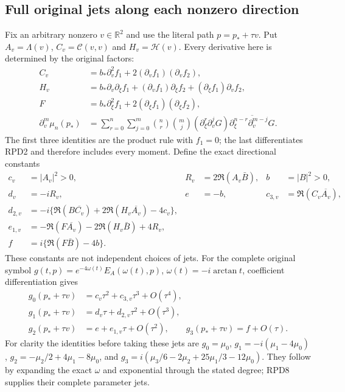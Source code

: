 \subsection{Full original jets along each nonzero direction}

Fix an arbitrary nonzero $v\in\mathbb R^2$ and use the literal path
$p=p_*+\tau v$.  Put
$A_v=\Lambda(v)$, $C_v=\mathcal C(v,v)$ and $H_v=\mathcal H(v)$.
Every derivative here is determined by the original factors:
\[
 \begin{aligned}
 C_v&=b_*\partial_v^2f_1+2(\partial_v f_1)(\partial_vf_2),\\
 H_v&=b_*\partial_v\partial_\xi f_1
          +(\partial_vf_1)\partial_\xi f_2
          +(\partial_\xi f_1)\partial_v f_2,\\
 F&=b_*\partial_\xi^2 f_1+2(\partial_\xi f_1)(\partial_\xi f_2),\\
 \partial_v^m\mu_n(p_*)&=\sum_{r=0}^n\sum_{j=0}^m
 \binom nr\binom mj(\partial_\xi^r\partial_v^jG)
       \overline{\partial_\xi^{n-r}\partial_v^{m-j}G}.
 \end{aligned}\tag{RPD8}
\]
The first three identities are the product rule with $f_1=0$;
the last differentiates RPD2 and therefore includes every moment.
Define the exact directional constants
\[
 \begin{aligned}
 c_v&=|A_v|^2>0,& R_v&=2\Re(A_v\bar B),& b&=|B|^2>0,\\
 d_v&=-iR_v,& e&=-b,& c_{3,v}&=\Re(C_v\overline{A_v}),\\
 d_{2,v}&=-i\{\Re(B\overline{C_v})+2\Re(H_v\overline{A_v})-4c_v\},\\
 e_{1,v}&=-\Re(F\overline{A_v})-2\Re(H_v\bar B)+4R_v,\\
 f&=i\{\Re(F\bar B)-4b\}.
 \end{aligned}\tag{RPD9}
\]
These constants are not independent choices of jets.  For the complete
original symbol
$g(t,p)=e^{-4\omega(t)}E_A(\omega(t),p)$,
$\omega(t)=-i\arctan t$, coefficient differentiation gives
\[
 \begin{aligned}
 g_0(p_*+\tau v)&=c_v\tau^2+c_{3,v}\tau^3+O(\tau^4),\\
 g_1(p_*+\tau v)&=d_v\tau+d_{2,v}\tau^2+O(\tau^3),\\
 g_2(p_*+\tau v)&=e+e_{1,v}\tau+O(\tau^2),\qquad
 g_3(p_*+\tau v)=f+O(\tau).
 \end{aligned}\tag{RPD10}
\]
For clarity the identities before taking these jets are
$g_0=\mu_0$, $g_1=-i(\mu_1-4\mu_0)$,
$g_2=-\mu_2/2+4\mu_1-8\mu_0$, and
$g_3=i(\mu_3/6-2\mu_2+25\mu_1/3-12\mu_0)$.
They follow by expanding the exact $\omega$ and exponential through
the stated degree; RPD8 supplies their complete parameter jets.

